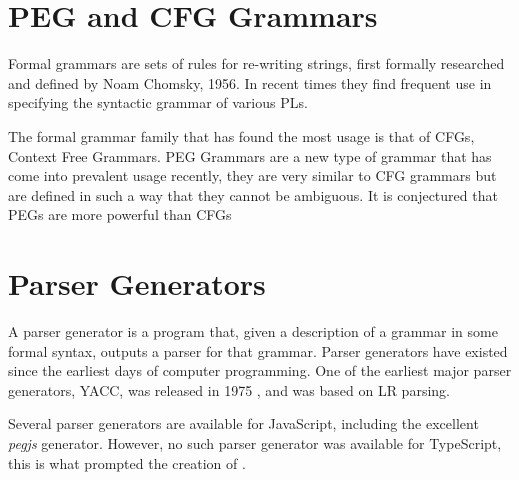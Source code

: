 \section{PEG and CFG Grammars}

Formal grammars are sets of rules for re-writing strings, first formally researched and defined by Noam Chomsky, 1956\cite{chomskypaper}. In recent times they find frequent use in specifying the syntactic grammar of various PLs.

The formal grammar family that has found the most usage is that of CFGs, Context Free Grammars. PEG Grammars are a new type of grammar that has come into prevalent usage recently, they are very similar to CFG grammars but are defined in such a way that they cannot be ambiguous. It is conjectured that PEGs are more powerful than CFGs\cite{pegconjecture}

\section{Parser Generators}

A parser generator is a program that, given a description of a grammar in some formal syntax, outputs a parser for that grammar. Parser generators have existed since the earliest days of computer programming. One of the earliest major parser generators, YACC, was released in 1975 \cite{yacc}, and was based on LR parsing.

Several parser generators are available for JavaScript, including the excellent \emph{pegjs} generator. However, no such parser generator was available for TypeScript, this is what prompted the creation of \tsPEG{}.
